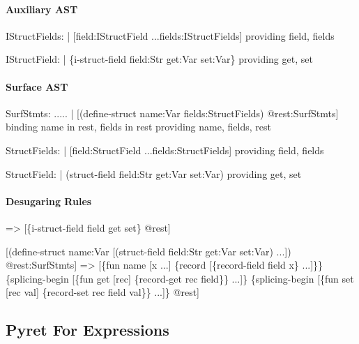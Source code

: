 



\paragraph{Auxiliary AST}
\begin{Codes}
IStructFields:
| [field:IStructField ...fields:IStructFields]
  providing field, fields

IStructField:
| \{i-struct-field field:Str get:Var set:Var\}
  providing get, set
\end{Codes}

\paragraph{Surface AST}
\begin{Codes}
SurfStmts:
  .....
| [(define-struct name:Var fields:StructFields) @rest:SurfStmts]
  binding name in rest, fields in rest
  providing name, fields, rest

StructFields:
| [field:StructField ...fields:StructFields]
  providing field, fields

StructField:
| (struct-field field:Str get:Var set:Var)
  providing get, set
\end{Codes}

\paragraph{Desugaring Rules}
\begin{Codes}
=> [\{i-struct-field field get set\} @rest]
  
   [(define-struct name:Var
      [(struct-field field:Str get:Var set:Var) ...]) @rest:SurfStmts]
=> [\{fun name [x ...] \{record [\{record-field field x\} ...]\}\}
    \{splicing-begin [\{fun get [rec] \{record-get rec field\}\} ...]\}
    \{splicing-begin [\{fun set [rec val] \{record-set rec field val\}\} ...]\}
    @rest]
\end{Codes}

\subsection{Pyret For Expressions}

